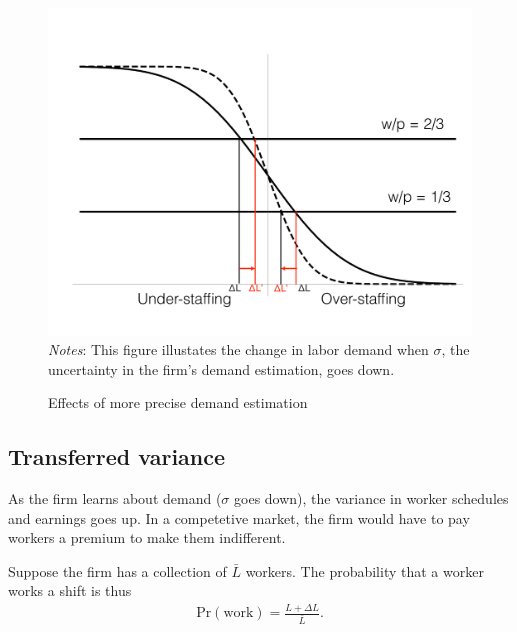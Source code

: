 \documentclass[11pt]{article}
\newcommand{\important}[1]{\textcolor{blue}{\textbf{ #1}}}
\newcommand{\quantclaim}[1]{\textcolor{red}{\textbf{ #1}}}
\begin{document}
\begin{figure}[h]
\centering 
\caption{Effects of more precise demand estimation} \label{fig:sigma}
\begin{minipage}{0.75 \linewidth}
\includegraphics[width = \linewidth]{./diagrams/precision_change.pdf}
\\
\emph{Notes}: This figure illustates the change in labor demand when $\sigma$, the uncertainty in the firm's demand estimation, goes down.  
\end{minipage} 
\end{figure}

\subsection{Transferred variance}
As the firm learns about demand ($\sigma$ goes down), the variance in worker schedules and earnings goes up. 
In a competetive market, the firm would have to pay workers a premium to make them indifferent.

Suppose the firm has a collection of $\bar{L}$ workers.
The probability that a worker works a shift is thus
\begin{align}
\mbox{Pr}(\mbox{work}) = \frac{L + \Delta L}{\bar{L}}. 
\end{align} 




\end{document}
